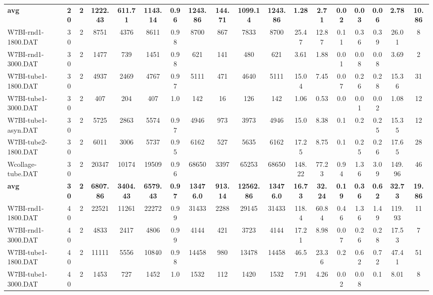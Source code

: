 \begin{sidewaystable}[h]
{\begin{tabular}{lccccccccccccccccc}
\cline{1-18} \textbf{avg} & \textbf{20} & \textbf{2} & \textbf{1222.43} & \textbf{611.71} & \textbf{1143.14} & \textbf{0.96} & \textbf{1243.86} & \textbf{144.71} & \textbf{1099.14} & \textbf{1243.86} & \textbf{1.28} & \textbf{2.71} & \textbf{0.02} & \textbf{0.03} & \textbf{0.06} & \textbf{2.78} & \textbf{10.86} \\ \cline{1-18}
W7BI-rnd1-1800.DAT & 30 & 2 & 8751 & 4376 & 8611 & 0.98 & 8700 & 867 & 7833 & 8700 & 25.47 & 12.87 & 0.11 & 0.36 & 0.39 & 26.01 & 8\\
W7BI-rnd1-3000.DAT & 30 & 2 & 1477 & 739 & 1451 & 0.98 & 621 & 141 & 480 & 621 & 3.61 & 1.88 & 0.01 & 0.08 & 0.08 & 3.69 & 2\\
W7BI-tube1-1800.DAT & 30 & 2 & 4937 & 2469 & 4767 & 0.97 & 5111 & 471 & 4640 & 5111 & 15.04 & 7.45 & 0.07 & 0.26 & 0.28 & 15.36 & 31\\
W7BI-tube1-3000.DAT & 30 & 2 & 407 & 204 & 407 & 1.0 & 142 & 16 & 126 & 142 & 1.06 & 0.53 & 0.0 & 0.01 & 0.02 & 1.08 & 12\\
W7BI-tube1-asyn.DAT & 30 & 2 & 5725 & 2863 & 5574 & 0.97 & 4946 & 973 & 3973 & 4946 & 15.0 & 8.38 & 0.1 & 0.2 & 0.25 & 15.35 & 12\\
W7BI-tube2-1800.DAT & 30 & 2 & 6011 & 3006 & 5737 & 0.95 & 6162 & 527 & 5635 & 6162 & 17.25 & 8.75 & 0.1 & 0.25 & 0.26 & 17.65 & 28\\
Wcollage-tube.DAT & 30 & 2 & 20347 & 10174 & 19509 & 0.96 & 68650 & 3397 & 65253 & 68650 & 148.22 & 77.23 & 0.94 & 1.36 & 3.09 & 149.96 & 46\\
\cline{1-18} \textbf{avg} & \textbf{30} & \textbf{2} & \textbf{6807.86} & \textbf{3404.43} & \textbf{6579.43} & \textbf{0.97} & \textbf{13476.0} & \textbf{913.14} & \textbf{12562.86} & \textbf{13476.0} & \textbf{16.73} & \textbf{32.24} & \textbf{0.19} & \textbf{0.36} & \textbf{0.62} & \textbf{32.73} & \textbf{19.86} \\ \cline{1-18}
W7BI-rnd1-1800.DAT & 40 & 2 & 22521 & 11261 & 22272 & 0.99 & 31433 & 2288 & 29145 & 31433 & 118.4 & 60.84 & 0.46 & 1.36 & 1.49 & 119.93 & 11\\
W7BI-rnd1-3000.DAT & 40 & 2 & 4833 & 2417 & 4806 & 0.99 & 4144 & 421 & 3723 & 4144 & 17.21 & 8.98 & 0.07 & 0.26 & 0.28 & 17.53 & 7\\
W7BI-tube1-1800.DAT & 40 & 2 & 11111 & 5556 & 10840 & 0.98 & 14458 & 980 & 13478 & 14458 & 46.5 & 23.36 & 0.2 & 0.62 & 0.72 & 47.41 & 51\\
W7BI-tube1-3000.DAT & 40 & 2 & 1453 & 727 & 1452 & 1.0 & 1532 & 112 & 1420 & 1532 & 7.91 & 4.26 & 0.02 & 0.08 & 0.1 & 8.01 & 8\\

\end{tabular}}
\end{sidewaystable}
